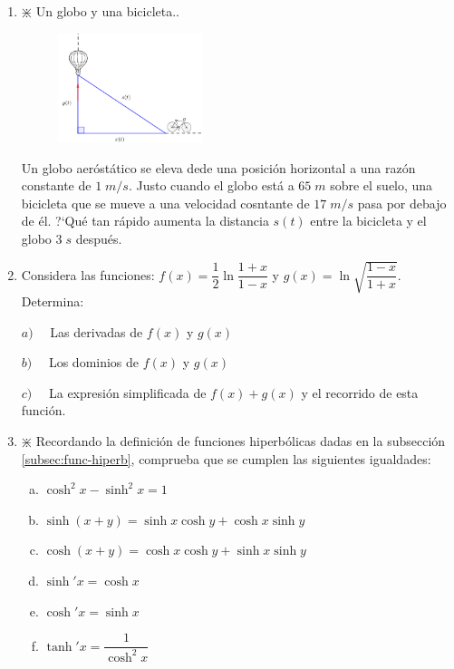 \begin{enumerate}
	
 
		
	\item $\divideontimes$  Un globo y una bicicleta..
		
	\begin{multicols}{2}
	\begin{figure}[H]
	\centering
	\includegraphics[width=0.4\textwidth]{imagenes/imagenes04/bici-globo.png}
	\end{figure}
	Un globo aeróstático se eleva dede una posición horizontal a una razón constante de $1\; m/s$. Justo cuando el globo está a $65 \; m$ sobre el suelo, una bicicleta que se mueve a una velocidad cosntante de $17\; m/s$ pasa por debajo de él. ?`Qué tan rápido aumenta la distancia $s(t)$ entre la bicicleta y el globo $3 \; s$ después.
	\end{multicols}
		
	\rightline{\textcolor{gris}{Solución: }}
		
		
		
		
		\item Considera las funciones:  $f(x)=\dfrac 1 2 \ln \dfrac {1+x}{1-x}$ y $g(x)=\ln \sqrt{\dfrac{1-x}{1+x}}$. Determina:
		
		$a) \quad$ Las derivadas de $f(x)$ y $g(x)$
		
		$b) \quad$ Los dominios de $f(x)$ y $g(x)$
		
		$c) \quad$ La expresión simplificada de $f(x)+g(x)$ y el recorrido de esta función.
		
		\rightline{\textcolor{gris}{Solución: $f'(x)=\dfrac 1 {1-x^2}=-g'(x); \quad D(f)=D(g)=]-1,1[$}}
		
		
		\item $\divideontimes$ Recordando la definición de funciones hiperbólicas dadas en la subsección \ref{subsec:func-hiperb}, comprueba que se cumplen las siguientes igualdades:
		
		\begin{enumerate}[a) ]
		\item $\cosh^2 x - \sinh^2 x=1$
		\item $\sinh(x+y)=\sinh x \cosh y + \cosh x \sinh y$
		\item $\cosh(x+y)=\cosh x \cosh y + \sinh x \sinh y$
		\item $\sinh' x= \cosh x$
		\item $\cosh'x=\sinh x$
		\item $\tanh'x=\dfrac {1}{\cosh^2 x}$
		

\end{enumerate}
\end{enumerate}
